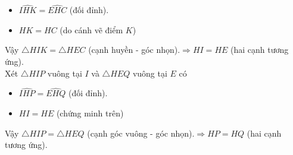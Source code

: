 \begin{ex}
{\begin{enumerate}
			\begin{itemize}
				\item $\widehat{IHK}=\widehat{EHC}$ (đối đỉnh).
				\item $HK=HC$ (do cánh vẽ điểm $K$)
			\end{itemize}
			Vậy $\triangle HIK=\triangle HEC$ (cạnh huyền - góc nhọn).$\Rightarrow HI=HE$ (hai cạnh tương ứng).\\
			Xét $\triangle HIP$ vuông tại $I$ và $\triangle HEQ$ vuông tại $E$ có
			\begin{itemize}
				\item $\widehat{IHP}=\widehat{EHQ}$ (đối đỉnh).
				\item $HI=HE$ (chứng minh trên)
			\end{itemize}
			Vậy $\triangle HIP=\triangle HEQ$ (cạnh góc vuông - góc nhọn).$\Rightarrow HP=HQ$ (hai cạnh tương ứng).
			
		\end{enumerate}
	}
\end{ex}
